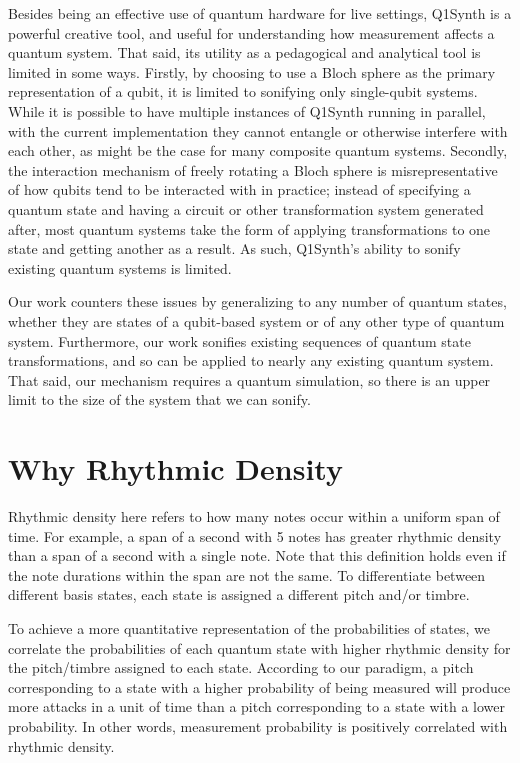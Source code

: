 \documentclass[10pt,twocolumn]{article}
\begin{document}
Besides being an effective use of quantum hardware for live settings, Q1Synth is a powerful creative tool, and useful for understanding how measurement affects a quantum system. That said, its utility as a pedagogical and analytical tool is limited in some ways. Firstly, by choosing to use a Bloch sphere as the primary representation of a qubit, it is limited to sonifying only single-qubit systems. While it is possible to have multiple instances of Q1Synth running in parallel, with the current implementation they cannot entangle or otherwise interfere with each other, as might be the case for many composite quantum systems. Secondly, the interaction mechanism of freely rotating a Bloch sphere is misrepresentative of how qubits tend to be interacted with in practice; instead of specifying a quantum state and having a circuit or other transformation system generated after, most quantum systems take the form of applying transformations to one state and getting another as a result\cite{qmdistilled}. As such, Q1Synth’s ability to sonify existing quantum systems is limited.

Our work counters these issues by generalizing to any number of quantum states, whether they are states of a qubit-based system or of any other type of quantum system. Furthermore, our work sonifies existing sequences of quantum state transformations, and so can be applied to nearly any existing quantum system. That said, our mechanism requires a quantum simulation, so there is an upper limit to the size of the system that we can sonify.

\section{Why Rhythmic Density} \label{sec:Why Rhythmic Density}

Rhythmic density here refers to how many notes occur within a uniform span of time. For example, a span of a second with 5 notes has greater rhythmic density than a span of a second with a single note. Note that this definition holds even if the note durations within the span are not the same. To differentiate between different basis states, each state is assigned a different pitch and/or timbre.

To achieve a more quantitative representation of the probabilities of states, we correlate the probabilities of each quantum state with higher rhythmic density for the pitch/timbre assigned to each state. According to our paradigm, a pitch corresponding to a state with a higher probability of being measured will produce more attacks in a unit of time than a pitch corresponding to a state with a lower probability. In other words, measurement probability is positively correlated with rhythmic density.
\end{document}
